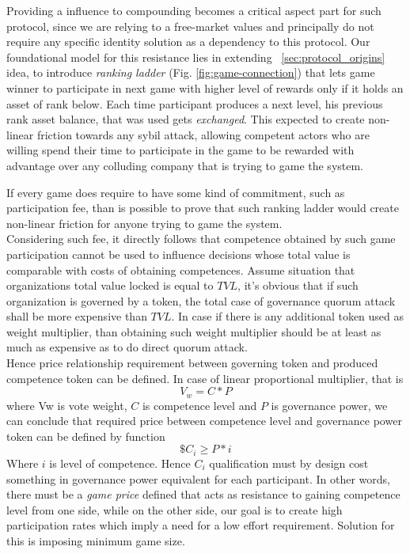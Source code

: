 \documentclass{article}
\begin{document}
\begin{CJK}{UTF8}{gbsn}
\begin{multicols}{2}
        Providing a influence to compounding becomes a critical aspect part for such protocol, since we are relying to a free-market values and principally do not require any specific identity solution as a dependency to this protocol.
        Our foundational model for this resistance lies in extending  ~\ref{sec:protocol_origins} idea, to introduce \textit{ranking ladder} (Fig. \ref*{fig:game-connection}) that lets game winner to participate in next game with higher level of rewards only if it holds an asset of rank below. Each time participant produces a next level, his previous rank asset balance, that was used gets \textit{exchanged}. This expected to create non-linear friction towards any sybil attack, allowing competent actors who are willing spend their time to participate in the game to be rewarded with advantage over any colluding company that is trying to game the system.

        If every game does require to have some kind of commitment, such as participation fee, than is possible to prove that such ranking ladder would create non-linear friction for anyone trying to game the system.\\
        Considering such fee, it directly follows that competence obtained by such game participation cannot be used to influence decisions whose total value is comparable with costs of obtaining competences. Assume situation that organizations total value locked is equal to $TVL$, it's obvious that if such organization is governed by a token, the total case of governance quorum attack shall be more expensive than $TVL$. In case if there is any additional token used as weight multiplier, than obtaining such weight multiplier should be at least as much as expensive as to do direct quorum attack. \\
        Hence price relationship requirement between governing token and produced competence token can be defined. In case of linear proportional multiplier, that is $$V_w=C*P$$ where Vw is vote weight, $C$ is competence level and $P$ is governance power, we can conclude that required price between competence level and governance power token can be defined by function
        $$\$C_i\geq P*i$$
        Where $i$ is level of competence.
        Hence $C_i$ qualification must by design cost something in governance power equivalent for each participant. In other words, there must be a \textit{game price} defined that acts as resistance to gaining competence level from one side, while on the other side, our goal is to create high participation rates which imply a need for a low effort requirement.
        Solution for this is imposing minimum game size.


\end{multicols}
\end{CJK}
\end{document}
